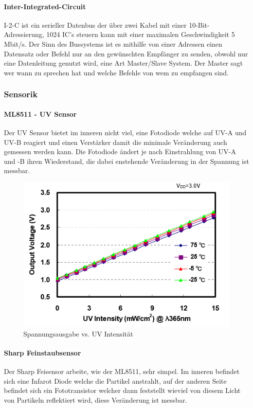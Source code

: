 \paragraph{Inter-Integrated-Circuit}
I-2-C ist ein serieller Datenbus der über zwei Kabel mit einer 10-Bit-Adressierung, 1024 IC's steuern kann mit einer maximalen Geschwindigkeit 5 Mbit/s. Der Sinn des Bussystems ist es mithilfe von einer Adressen einen Datensatz oder Befehl nur an den gewünschten Empfänger zu senden, obwohl nur eine Datenleitung genutzt wird, eine Art Master/Slave System. Der Master sagt wer wann zu sprechen hat und welche Befehle von wem zu empfangen sind.

\subsubsection{Sensorik}
\paragraph{ML8511 - UV Sensor}
Der UV Sensor bietet im inneren nicht viel, eine Fotodiode welche auf UV-A und UV-B reagiert und einen Verstärker damit die minimale Veränderung auch gemessen werden kann. Die Fotodiode ändert je nach Einstrahlung von UV-A und -B ihren Wiederstand, die dabei enstehende Veränderung in der Spannung ist messbar.

\begin{figure}[h]
	\centering
	\includegraphics[scale=0.4]{2_Beschreibung_des_CANSAT/graph_photodiode_response.png}
	\caption{Spannungsausgabe vs. UV Intensität}
	\label{graph photodiode}
\end{figure}


\paragraph{Sharp Feinstaubsensor}
Der Sharp Feisensor arbeite, wie der ML8511, sehr simpel. Im inneren befindet sich eine Infarot Diode welche die Partikel anstrahlt, auf der anderen Seite befindet sich ein Fototransistor welcher dann feststellt wieviel von diesem Licht von Partikeln reflektiert wird, diese Veränderung ist messbar.

